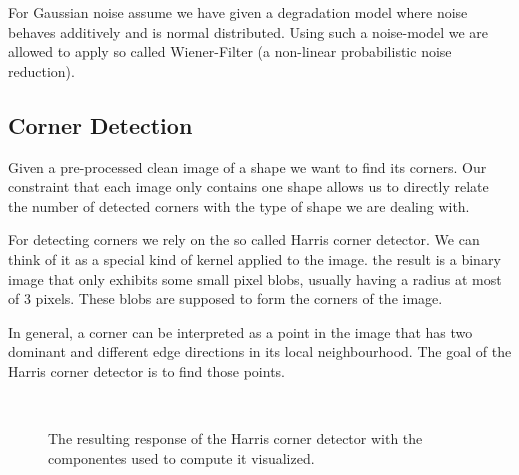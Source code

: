 \documentclass[conference]{IEEEtran}
\begin{document}
For Gaussian noise assume we have given a degradation model where noise behaves additively and is normal distributed. Using such a noise-model we are allowed to apply so called Wiener-Filter (a non-linear probabilistic noise reduction). 

\subsection{Corner Detection}
\label{sub:corner_detection}
Given a pre-processed clean image of a shape we want to find its corners. Our constraint that each image only contains one shape allows us to directly relate the number of detected corners with the type of shape we are dealing with. 

For detecting corners we rely on the so called Harris corner detector. We can think of it as a special kind of kernel applied to the image. the result is a binary image that only exhibits some small pixel blobs, usually having a radius at most of 3 pixels. These blobs are supposed to form the corners of the image. \

In general, a corner can be interpreted as a point in the image that has two dominant and different edge directions in its local neighbourhood. The goal of the Harris corner detector is to find those points. 

\begin{figure}[ht!]%
\centering
{}
\\
\caption{The resulting response of the Harris corner detector with the componentes
used to compute it visualized.}
\end{figure}
\end{document}
